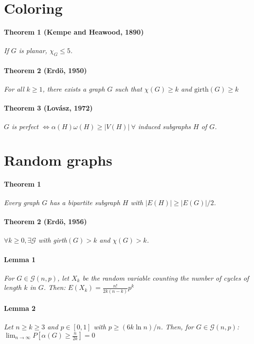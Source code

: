 \documentclass[a4paper,10pt]{article}
\begin{document}
\section{Coloring}
\paragraph{Theorem 1 (Kempe and Heawood, 1890)}
		\textit{If $G$ is planar, $\chi_{G} \leq 5$.}

\paragraph{Theorem 2 (Erdö, 1950)} \textit{For all $k \geq 1$, there exists a graph $G$ such that $\chi(G) \geq k $ and $\text{girth}(G) \geq k$}

\paragraph{Theorem 3 (Lovász, 1972)}
	\textit{$G$ is perfect $\iff \alpha(H) \omega(H) \geq |V(H)| ~ \forall$ induced subgraphs $H$ of $G$.}
	
	
\section{Random graphs}
\paragraph{Theorem 1}
\textit{Every graph $G$ has a bipartite subgraph $H$ with $|E(H)| \geq |E(G)|/2$.}


\paragraph{Theorem 2 (Erdö, 1956)}
\textit{$\forall k \geq 0, \exists \mathcal{G}$ with girth$(G) > k$ and $\chi(G) > k$.}

\paragraph{Lemma 1}
\textit{For $G \in \mathcal{G}(n,p)$, let $X_k$ be the random variable counting the number of cycles of length $k$ in $G$. Then: $E(X_k) = \frac{n!}{2k(n-k)} p^k$}

\paragraph{Lemma 2}
\textit{Let $n \geq k \geq 3$ and $p \in [0,1]$ with $p \geq (6k \ln n)/n$. Then, for $G \in \mathcal{G}(n,p)$: $\lim_{n \rightarrow \infty} P[\alpha(G) \geq \frac{n}{2k}] = 0$}
\end{document}
